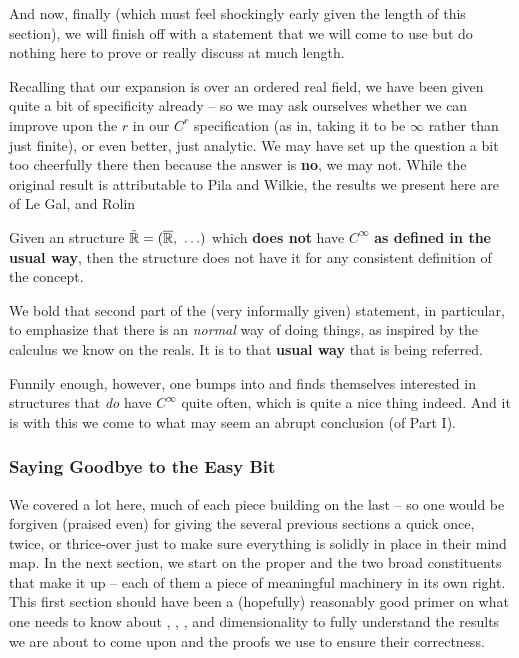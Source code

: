And now, finally (which must feel shockingly early given the length of this section), we will finish off with a statement that we will come to use but do nothing here to prove or really discuss at much length.

Recalling that our expansion is over an ordered real field, we have been given quite a bit of specificity already -- so we may ask ourselves whether we can improve upon the $r$ in our $C^r$ specification (as in, taking it to be $\infty$ rather than just finite), or even better, just analytic. We may have set up the question a bit too cheerfully there then because the answer is \textbf{no}, we may not. While the original result is attributable to Pila and Wilkie, the results we present here are of Le Gal, and Rolin \cite{gal_o-minimal_2009}

\begin{proposition}
  Given an \om structure $\tilde{\mathbb{R}} = (\overline{\mathbb{R}}, \ \hdots)$ which \textbf{does not} have $C^{\infty}$ \cd \textbf{as defined in the usual way}, then the structure does not have it for any consistent definition of the concept.
\end{proposition}

We bold that second part of the (very informally given) statement, in particular, to emphasize that there is an \emph{normal} way of doing things, as inspired by the calculus we know on the reals. It is to that \textbf{usual way} that is being referred.

Funnily enough, however, one bumps into and finds themselves interested in structures that \emph{do} have $C^{\infty}$ \cd quite often, which is quite a nice thing indeed. And it is with this we come to what may seem an abrupt conclusion (of Part I).


\subsubsection{Saying Goodbye to the Easy Bit}

We covered a lot here, much of each piece building on the last -- so one would be forgiven (praised even) for giving the several previous sections a quick once, twice, or thrice-over just to make sure everything is solidly in place in their mind map. In the next section, we start on the \pwt proper and the two broad constituents that make it up -- each of them a piece of meaningful machinery in its own right. This first section should have been a (hopefully) reasonably good primer on what one needs to know about \omy, \cds, \scds, and dimensionality to fully understand the results we are about to come upon and the proofs we use to ensure their correctness.
